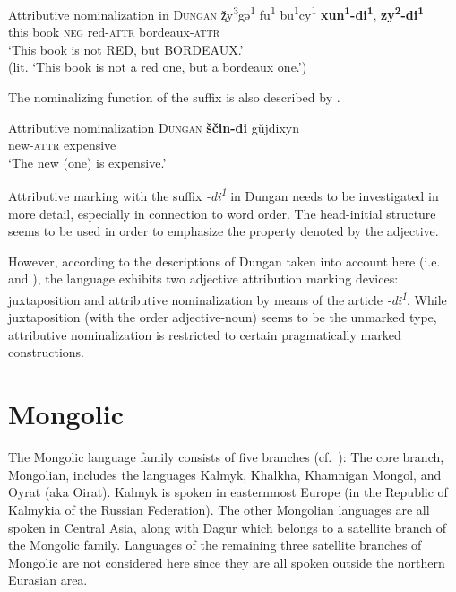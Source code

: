 \begin{exe}
\ex Attributive nominalization in \textsc{Dungan} \cite[82]{zevachina2001}
\gll	ž̨y\textsuperscript{3}gə\textsuperscript{1} fu\textsuperscript{1} bu\textsuperscript{1}cy\textsuperscript{1} \textbf{xun\textsuperscript{1}-di\textsuperscript{1}}, \textbf{zy\textsuperscript{2}-di\textsuperscript{1}}\\
	this book \textsc{neg} red-\textsc{attr} bordeaux-\textsc{attr}\\
\glt	‘This book is not RED, but BORDEAUX.’\\
	(lit. ‘This book is not a red one, but a bordeaux one.’)
\end{exe}
The nominalizing function of the suffix is also described by \cite{kalimov1968}.
\begin{exe}
\ex Attributive nominalization \textsc{Dungan} \cite[484]{kalimov1968} \label{dungan nmlz}
\gll	\textbf{ščin-di} gǔjdixyn\\
	new-\textsc{attr} expensive\\
\glt	‘The new (one) is expensive.’
\end{exe}
Attributive marking with the suffix \textit{-di\textsuperscript{1}} in Dungan needs to be investigated in more detail, especially in connection to word order. The head-initial structure seems to be used in order to emphasize the property denoted by the adjective.

However, according to the descriptions of Dungan taken into account here (i.e.~\citealt{kalimov1968} and \citealt{zevachina2001}), the language exhibits two adjective attribution marking devices: juxtaposition and attributive nominalization by means of the article \textit{-di\textsuperscript{1}}. While juxtaposition (with the order adjective-noun) seems to be the unmarked type, attributive nominalization is restricted to certain pragmatically marked constructions.

\section{Mongolic}
The Mongolic language family consists of five branches (cf.~\citealt[222]{salminen2007}): The core branch, Mongolian, includes the languages Kalmyk, Khalkha, Khamnigan Mongol, and Oyrat (aka Oirat). Kalmyk is spoken in easternmost Europe (in the Republic of Kalmykia of the Russian Federation). The other Mongolian languages are all spoken in Central Asia, along with Dagur which belongs to a satellite branch of the Mongolic family. Languages of the remaining three satellite branches of Mongolic are not considered here since they are all spoken outside the northern Eurasian area.\\
				
